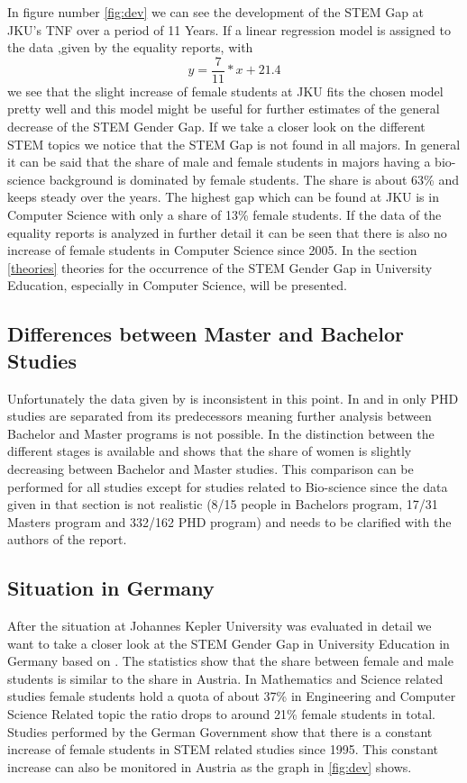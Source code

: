 \documentclass[12pt]{article}
\begin{document}
In figure number \ref{fig:dev} we can see the development of the STEM Gap at JKU's TNF over a period of 11 Years. If   a linear regression model is assigned to the data ,given by the equality reports, with 
\begin{equation}
y= \frac{7}{11}*x+21.4
\end{equation}  we see that the slight increase of female students at JKU fits the chosen model pretty well and this model might be useful for further estimates of the general decrease of the STEM Gender Gap.
If we take a closer look on the different STEM topics we notice that the STEM Gap is not found in all majors. In general it can be said that the share of male and female students in majors having a bio-science background   is dominated by female students. The share is about 63\% and keeps steady over the years. 
The highest gap which can be found at JKU is in Computer Science with only a share of 13\% female students. If the data of the equality reports is analyzed in further detail it can be seen that there is also no increase of female students in Computer Science since 2005. In the section \ref{theories} theories for the occurrence of the STEM Gender Gap in University Education, especially in Computer Science, will be presented.
\subsection {Differences between Master and Bachelor Studies}
Unfortunately the data given by \cite{eq_1}\cite{eq_2}\cite{eq_3} is inconsistent in this point. In \cite{eq_1}and in \cite{eq_2} only PHD studies are separated from its predecessors meaning further analysis between Bachelor and Master programs is not possible. In \cite{eq_3} the distinction between the different stages is available and shows that the share of women is slightly decreasing between Bachelor and Master studies. This comparison can be performed for all studies except for studies related to Bio-science since the data given in that section is not realistic (8/15 people in Bachelors program, 17/31 Masters program and 332/162 PHD program) and needs to be clarified with the authors of the report. 
\subsection{Situation in Germany}
After the situation at Johannes Kepler University was evaluated in detail we want to take a closer look at the STEM Gender Gap in University Education in Germany based on \cite{schneider}. The statistics show that the share between female and male students is similar to the share in Austria. In Mathematics and Science related studies female students hold a quota of about  37\% in Engineering and Computer Science Related topic the ratio drops to around 21\% female students in total. Studies performed by the German Government show that there is a constant increase of female students in STEM related studies since 1995. This constant increase can also be monitored in Austria as the graph in \ref{fig:dev} shows.\newline
\end{document}
